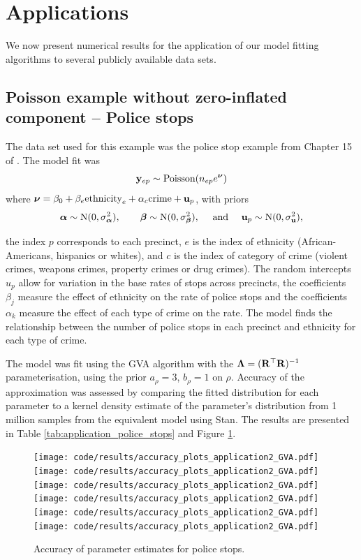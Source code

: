 \section{Applications}
We now present numerical results for the application of our model fitting
algorithms to several publicly available data sets.

\label{sec:application}

\subsection{Poisson example without zero-inflated component -- Police stops}
\label{sec:police_stops}
The data set used for this example was the police stop example from Chapter 15
of \cite{Gelman2007}.  The model fit was
\begin{equation*}
	{\bf y}_{ep}        \sim \text{Poisson}(n_{ep} e^{\boldsymbol \nu})
\end{equation*}
\noindent where ${\boldsymbol \nu} = {\beta_0 + \beta_e \text{ethnicity}_e + \alpha_{c} \text{crime} + {\bf u}_p}$, 
with priors
$$
{\boldsymbol \alpha} \sim \text{N}(0, \sigma_{\boldsymbol \alpha}^2), 
\qquad 	
{\boldsymbol\beta} \sim \text{N}(0, \sigma_{\boldsymbol \beta}^2), \quad \mbox{ and } \quad 
	{\bf u}_p \sim \text{N}(0, \sigma_{\bf u}^2),
$$

\noindent the index
$p$ corresponds to each precinct, $e$ is the index of ethnicity
(African-Americans, hispanics or whites), and $c$ is the index of category of
crime (violent crimes, weapons crimes, property crimes or drug crimes). The
random intercepts $u_p$ allow for variation in the base rates of stops across
precincts, the coefficients $\beta_j$ measure the effect of ethnicity on the
rate of police stops and the coefficients $\alpha_k$ measure the effect of
each type of crime on the rate. The model finds the relationship between the
number of police stops in each precinct and  ethnicity for each type of crime.

The model was fit using the GVA algorithm with the ${\boldsymbol \Lambda} = ({\bf R}^\top
{\bf R})^{-1}$ parameterisation, using the prior $a_\rho = 3$, $b_\rho = 1$ on
$\rho$. Accuracy of the approximation was assessed by comparing the fitted
distribution for each parameter to a kernel density estimate of the parameter's
distribution from 1 million samples from the equivalent model using
Stan. The results are presented in Table \ref{tab:application_police_stops} and
Figure \ref{fig:police_stops}.

\begin{figure}
\centering
  \texttt{[image: code/results/accuracy\_plots\_application2\_GVA.pdf]}
  \texttt{[image: code/results/accuracy\_plots\_application2\_GVA.pdf]}
  \texttt{[image: code/results/accuracy\_plots\_application2\_GVA.pdf]}
  \texttt{[image: code/results/accuracy\_plots\_application2\_GVA.pdf]}
  \texttt{[image: code/results/accuracy\_plots\_application2\_GVA.pdf]}
  \texttt{[image: code/results/accuracy\_plots\_application2\_GVA.pdf]}
\caption{Accuracy of parameter estimates for police stops.}
\label{fig:police_stops}
\end{figure}

